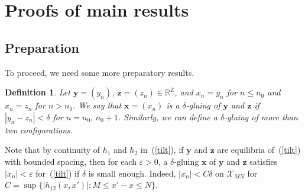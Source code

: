 \documentclass[12pt]{article}
\newcommand{\R}{\mathbb{R}}
\newcommand{\Z}{\mathbb{Z}}
\newcommand{\eps}{\varepsilon}
\newcounter{number}
\newtheorem{definition}{Definition}
\newcommand{\begde}{\begin{definition}\hspace{1em}}
\newcommand{\ede}{\end{definition}
                           \addtocounter{number}{1}}
\newcommand{\newsection}[1]{    \section{#1}
                               \setcounter{equation}{0}
                                \setcounter{number}{1} }
\newcommand{\refer}[1]{~(\ref{#1})}
\newcommand{\zbf}{{\mathbf{z}}}
\newcommand{\xbf}{{\mathbf{x}}}
\newcommand{\ybf}{{\mathbf{y}}}
\begin{document}
\newsection{Proofs of main results}\label{sec:pf}
\subsection{Preparation}
To proceed, we need some more preparatory results.
\begde\label{glue}
Let $\ybf=(y_n)$, $\zbf=(z_n)\in\R^\Z$, and $x_n=y_n$ for $n\leq n_0$ and $x_n=z_n$ for $n>n_0$. We say that $\xbf=(x_n)$ is a $\delta$-gluing of $\ybf$ and $\zbf$ if $|y_n-z_n|<\delta$ for $n=n_0,\,n_0+1$. Similarly, we can define a $\delta$-gluing of more than two configurations.
\ede
Note that by continuity of $h_1$ and $h_2$ in\refer{tilt}, if $\ybf$ and $\zbf$ are equilibria of\refer{tilt} with bounded spacing, then for each $\eps>0$, a $\delta$-gluing $\xbf$ of $\ybf$ and $\zbf$ satisfies
$|\dot{x}_n|<\eps$ for\refer{tilt} if $\delta$ is small enough.  Indeed, $|\dot{x}_n| < C \delta$ on $\mathcal{X}_{MN}$ for $C=\sup \{|h_{12}(x,x')| : M\le x'-x \le N\}$.
\end{document}
